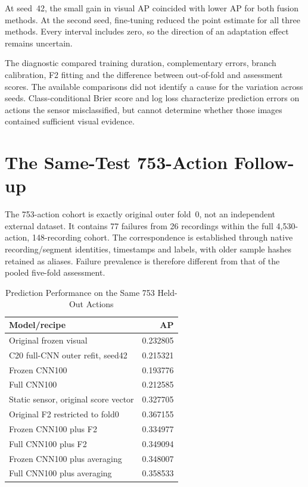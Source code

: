 At seed~42, the small gain in visual AP coincided with lower AP for both fusion methods. At the second seed, fine-tuning reduced the point estimate for all three methods. Every interval includes zero, so the direction of an adaptation effect remains uncertain.

The diagnostic compared training duration, complementary errors, branch calibration, F2 fitting and the difference between out-of-fold and assessment scores. The available comparisons did not identify a cause for the variation across seeds. Class-conditional Brier score and log loss characterize prediction errors on actions the sensor misclassified, but cannot determine whether those images contained sufficient visual evidence.

\section{The Same-Test 753-Action Follow-up}
The 753-action cohort is exactly original outer fold~0, not an independent external dataset. It contains 77 failures from 26 recordings within the full 4,530-action, 148-recording cohort. The correspondence is established through native recording/segment identities, timestamps and labels, with older sample hashes retained as aliases. Failure prevalence is therefore different from that of the pooled five-fold assessment.

\begin{table}[htbp]
\caption{Prediction Performance on the Same 753 Held-Out Actions}\label{tab:753-supplement}
\centering\small

\begin{tabular}{lr}\hline Model/recipe&AP\\\hline
Original frozen visual&0.232805\\
C20 full-CNN outer refit, seed42&0.215321\\
Frozen CNN100&0.193776\\
Full CNN100&0.212585\\
Static sensor, original score vector&0.327705\\
Original F2 restricted to fold0&0.367155\\
Frozen CNN100 plus F2&0.334977\\
Full CNN100 plus F2&0.349094\\
Frozen CNN100 plus averaging&0.348007\\
Full CNN100 plus averaging&0.358533\\\hline
\end{tabular}
\end{table}

